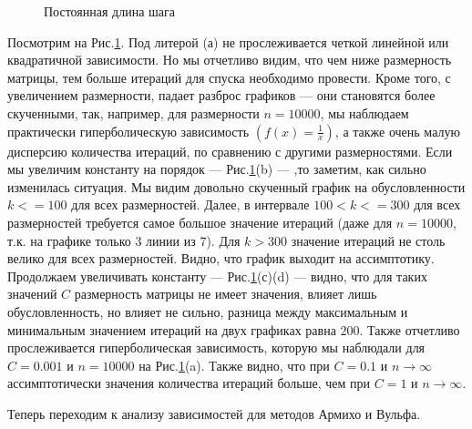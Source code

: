 \documentclass{article}
\begin{document}
\begin{figure}[H]
		\hfill %
		\caption{Постоянная длина шага}
		\label{fig:const_alpha}
	\end{figure}

	Посмотрим на Рис.\ref{fig:const_alpha}. Под литерой (а) не прослеживается четкой линейной или квадратичной зависимости. Но мы отчетливо видим, что чем ниже размерность матрицы, тем больше итераций для спуска необходимо провести. Кроме того, с увеличением размерности, падает разброс графиков --- они становятся более скученными, так, например, для размерности $n = 10000$, мы наблюдаем практически гиперболическую зависимость $(f(x) = \frac{1}{x})$, а также очень малую дисперсию количества итераций, по сравнению с другими размерностями. Если мы увеличим константу на порядок --- Рис.\ref{fig:const_alpha}(b) --- ,то заметим, как сильно изменилась ситуация. Мы видим довольно скученный график на обусловленности $k <= 100$ для всех размерностей. Далее, в интервале $100 < k <= 300$ для всех размерностей требуется самое большое значение итераций (даже для $n = 10000$, т.к. на графике только 3 линии из 7). Для $k>300$ значение итераций не столь велико для всех размерностей. Видно, что график выходит на ассимптотику. Продолжаем увеличивать константу --- Рис.\ref{fig:const_alpha}(с)(d) --- видно, что для таких значений $C$ размерность матрицы не имеет значения, влияет лишь обусловленность, но влияет не сильно, разница между максимальным и минимальным значением итераций на двух графиках равна $200$. Также отчетливо прослеживается гиперболическая зависимость, которую мы наблюдали для $C = 0.001$ и $n = 10000$ на Рис.\ref{fig:const_alpha}(a). Также видно, что при $C = 0.1$ и $n \rightarrow \infty$ ассимптотически значения количества итераций больше, чем при $C = 1$ и $n \rightarrow \infty$.
	
	\vspace{1cm}
	Теперь переходим к анализу зависимостей для методов Армихо и Вульфа. 
	
\end{document}
